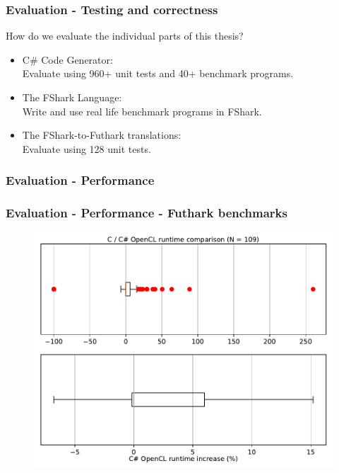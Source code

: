 \documentclass[10pt, compress, usenames, dvipsnames]{beamer}
\begin{document}
\begin{frame}[fragile]
  \frametitle{Evaluation - Testing and correctness}
  How do we evaluate the individual parts of this thesis?
  \begin{itemize}
  \item<2-> C\# Code Generator:\\
    Evaluate using 960+ unit tests and 40+ benchmark programs.
\item<3-> The FShark Language:\\
  Write and use real life benchmark programs in FShark.
\item<4-> The FShark-to-Futhark translations:\\
  Evaluate using 128 unit tests.
  \end{itemize}
\end{frame}


\begin{frame}[fragile]
  \frametitle{Evaluation - Performance}




\end{frame}
\begin{frame}[fragile]
  \frametitle{Evaluation - Performance - Futhark benchmarks}
  \begin{figure}
  \includegraphics[scale=0.6]{./images/boxplot}
  \end{figure}
\end{frame}
\end{document}
